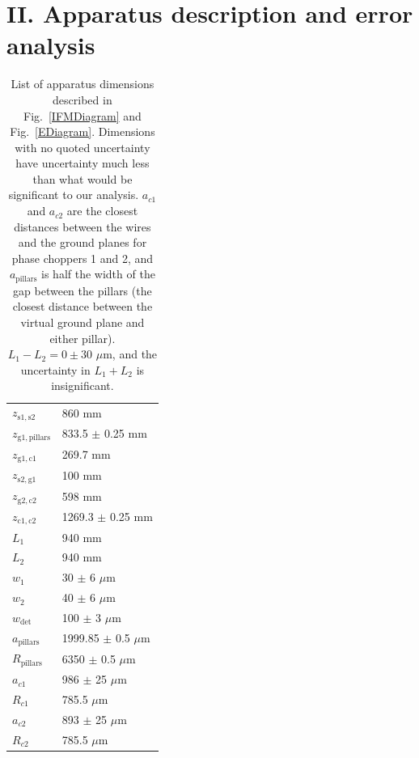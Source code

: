 \documentclass[twocolumn,pra,showpacs,superscriptaddress,longbibliography]{revtex4-1}   %
\newcommand{\figref}[1]{Fig.~\ref{#1}}
\begin{document}


\section{II. Apparatus description and error analysis}

\begingroup
\begin{table}
\caption{\label{tableDimensions}List of apparatus dimensions described in \figref{IFMDiagram} and \figref{EDiagram}. Dimensions with no quoted uncertainty have uncertainty much less than what would be significant to our analysis.
$a_{c1}$ and $a_{c2}$ are the closest distances between the wires and the ground planes for phase choppers 1 and 2, and $a_{\mathrm{pillars}}$ is half the width of the gap between the pillars (the closest distance between the virtual ground plane and either pillar). $L_1-L_2 = 0 \pm 30$ $\mu$m, and the uncertainty in $L_1 + L_2$ is insignificant.}
\begin{center}
\begin{tabular}{l l}
\hline\hline
$z_{\mathrm{s1,s2}}$ & 860 mm \\
$z_{\mathrm{g1,pillars}}$ & 833.5 $\pm$ 0.25 mm \\
$z_{\mathrm{g1,c1}}$ & 269.7 mm \\
$z_{\mathrm{s2,g1}}$ & 100 mm \\
$z_{\mathrm{g2,c2}}$ & 598 mm \\
$z_{\mathrm{c1,c2}}$ & 1269.3 $\pm$ 0.25 mm \\
$L_1$ & 940 mm \\
$L_2$ & 940 mm \\
$w_1$ & 30 $\pm$ 6 $\mu$m \\
$w_2$ & 40 $\pm$ 6 $\mu$m \\
$w_{\mathrm{det}}$ & 100 $\pm$ 3 $\mu$m \\ 
$a_{\mathrm{pillars}}$ & 1999.85 $\pm$ 0.5 $\mu$m \\
$R_{\mathrm{pillars}}$ & 6350 $\pm$ 0.5 $\mu$m \\
$a_{c1}$ & 986 $\pm$ 25 $\mu$m \\
$R_{c1}$ & 785.5 $\mu$m \\
$a_{c2}$ & 893 $\pm$ 25 $\mu$m \\
$R_{c2}$ & 785.5 $\mu$m \\
\hline\hline
\end{tabular}
\end{center}
\end{table}
\endgroup
\end{document}
